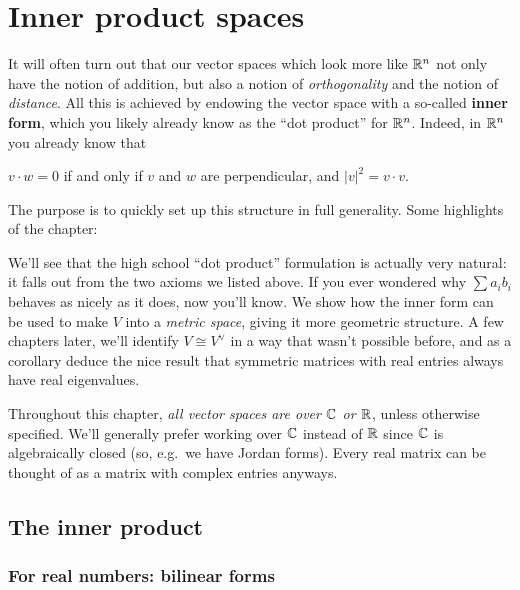 \chapter{Inner product spaces}
\label{ch:inner_product_spaces}
It will often turn out that our vector spaces which look more like $\mathbb R^n$
not only have the notion of addition, but also a notion of \emph{orthogonality}
and the notion of \emph{distance}.
All this is achieved by endowing the vector space with a so-called \textbf{inner form},
which you likely already know as the ``dot product'' for $\mathbb R^n$.
Indeed, in $\mathbb R^n$ you already know that
\begin{itemize}
	\ii $v \cdot w = 0$ if and only if $v$ and $w$ are perpendicular, and
	\ii $|v|^2 = v \cdot v$.
\end{itemize}
The purpose is to quickly set up this structure in full generality.
Some highlights of the chapter:
\begin{itemize}
	\ii We'll see that the high school ``dot product''
	formulation is actually very natural:
	it falls out from the two axioms we listed above.
	If you ever wondered why $\sum a_i b_i$ behaves as nicely as it does,
	now you'll know.
	\ii We show how the inner form can be used to make $V$ into a \emph{metric space},
	giving it more geometric structure.
	\ii A few chapters later,
	we'll identify $V \cong V^\vee$ in a way that wasn't possible before,
	and as a corollary deduce the nice result that
	symmetric matrices with real entries
	always have real eigenvalues.
\end{itemize}

Throughout this chapter, \emph{all vector spaces are over $\mathbb C$ or $\mathbb R$},
unless otherwise specified.
We'll generally prefer working over $\mathbb C$ instead of $\mathbb R$ since
$\mathbb C$ is algebraically closed
(so, e.g.\ we have Jordan forms).
Every real matrix can be thought of as a matrix
with complex entries anyways.

\section{The inner product}
\subsection{For real numbers: bilinear forms}

